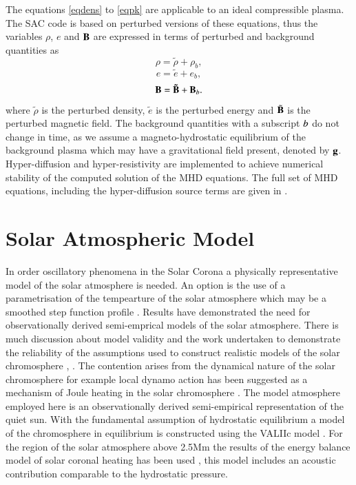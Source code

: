 \documentclass{aa}
\begin{document}
The equations \eqref{eqdens} to \eqref{eqpk} are applicable to an ideal compressible plasma. The SAC code is based on perturbed versions of these equations, thus the variables $\rho $, $e$ and  $\bf B$ are expressed in terms of perturbed and background quantities as
\begin{equation}
\rho = \tilde{\rho}+\rho _{b},
\end{equation}
\begin{equation}
e = \tilde{e}+e _{b},
\end{equation}
\begin{equation}
\bf B = \tilde{\bf B}+{\bf B}_{\it{b}}.
\end{equation}
where $\tilde{\rho}$ is the  perturbed density,  $\tilde{e}$ is the perturbed energy and $\tilde{\bf B}$  is the perturbed magnetic field. The background quantities with a subscript $\it{b}$ do not change in time, as we assume a magneto-hydrostatic equilibrium of the background plasma which may have a gravitational field present, denoted by $\bf g$. Hyper-diffusion and hyper-resistivity \cite{Caunt2001}
are implemented to achieve numerical stability of the computed solution of the MHD equations.  The full set of MHD equations, including the hyper-diffusion source terms are given in \cite{Griffiths2015}\cite{Shelyag2008}.











\section{Solar Atmospheric Model}
In order oscillatory phenomena in the Solar Corona a physically representative model of the solar atmosphere is needed. An option is the use of a parametrisation of the tempearture of the solar atmosphere which may be a smoothed step function profile  \cite{Murawski2010}. Results have demonstrated the need for observationally derived semi-emprical models of the solar atmosphere. There is much discussion about model validity and the work undertaken to demonstrate the reliability of the assumptions used to construct realistic models of the solar chromosphere \cite{Carlsson1995}, \cite{Kalkofen2012}. The contention arises from the dynamical nature of the solar chromosphere for example local dynamo action has been suggested as a mechanism of Joule heating in the solar chromosphere \cite{Leenaarts2011}. The model atmosphere employed here is an observationally derived semi-empirical representation of the quiet sun. With the fundamental assumption of hydrostatic equilibrium a model of the chromosphere in equilibrium is constructed using the VALIIc model \cite{Vernazza1981}. For the region of the solar atmosphere above 2.5Mm the results of the energy balance model of solar coronal heating has been used  \cite{McWhirter1975}, this model includes an acoustic contribution comparable to the hydrostatic pressure.
\end{document}
